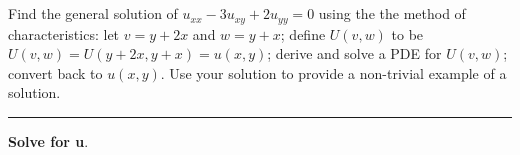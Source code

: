 \documentclass[10pt]{article}
\begin{document}
\newpage


\section{\underline{}}
\label{sec: Problem 6}

\noindent
Find the general solution of $ \displaystyle u_{xx} - 3u_{xy} + 2u_{yy} = 0 $ using the  the method of characteristics: 
let $ \displaystyle v = y + 2x $ and $ \displaystyle w = y + x $; 
define $ \displaystyle U(v,w) $ to be $ \displaystyle U(v,w) = U(y + 2x,y + x) = u(x,y) $; 
derive and solve a PDE for $ \displaystyle U(v,w) $; 
convert back to $ \displaystyle u(x,y) $. 
Use your solution to provide a non-trivial example of a solution. \\
\vspace{2.5mm}

\hrule 

\vspace{7.5mm}

\noindent
\textbf{Solve for u}. \\
\end{document}

